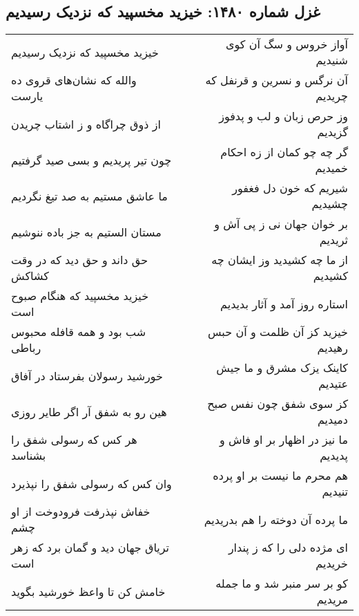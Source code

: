 \begin{center}
\section*{غزل شماره ۱۴۸۰: خیزید مخسپید که نزدیک رسیدیم}
\label{sec:1480}
\begin{longtable}{l p{0.5cm} r}
خیزید مخسپید که نزدیک رسیدیم
&&
آواز خروس و سگ آن کوی شنیدیم
\\
والله که نشان‌های قروی ده یارست
&&
آن نرگس و نسرین و قرنفل که چریدیم
\\
از ذوق چراگاه و ز اشتاب چریدن
&&
وز حرص زبان و لب و پدفوز گزیدیم
\\
چون تیر پریدیم و بسی صید گرفتیم
&&
گر چه چو کمان از زه احکام خمیدیم
\\
ما عاشق مستیم به صد تیغ نگردیم
&&
شیریم که خون دل فغفور چشیدیم
\\
مستان الستیم به جز باده ننوشیم
&&
بر خوان جهان نی ز پی آش و ثریدیم
\\
حق داند و حق دید که در وقت کشاکش
&&
از ما چه کشیدید وز ایشان چه کشیدیم
\\
خیزید مخسپید که هنگام صبوح است
&&
استاره روز آمد و آثار بدیدیم
\\
شب بود و همه قافله محبوس رباطی
&&
خیزید کز آن ظلمت و آن حبس رهیدیم
\\
خورشید رسولان بفرستاد در آفاق
&&
کاینک یزک مشرق و ما جیش عتیدیم
\\
هین رو به شفق آر اگر طایر روزی
&&
کز سوی شفق چون نفس صبح دمیدیم
\\
هر کس که رسولی شفق را بشناسد
&&
ما نیز در اظهار بر او فاش و پدیدیم
\\
وان کس که رسولی شفق را نپذیرد
&&
هم محرم ما نیست بر او پرده تنیدیم
\\
خفاش نپذرفت فرودوخت از او چشم
&&
ما پرده آن دوخته را هم بدریدیم
\\
تریاق جهان دید و گمان برد که زهر است
&&
ای مژده دلی را که ز پندار خریدیم
\\
خامش کن تا واعظ خورشید بگوید
&&
کو بر سر منبر شد و ما جمله مریدیم
\\
\end{longtable}
\end{center}
